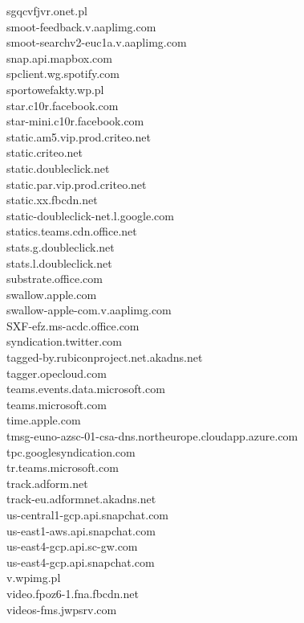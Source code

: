 \documentclass[12pt,a4paper]{article}
\begin{document}
\begin{scriptsize}
\begin{multicols}{3}
\begin{center}
                    sgqcvfjvr.onet.pl\\smoot-feedback.v.aaplimg.com\\smoot-searchv2-euc1a.v.aaplimg.com\\snap.api.mapbox.com\\spclient.wg.spotify.com\\
                    sportowefakty.wp.pl\\star.c10r.facebook.com\\star-mini.c10r.facebook.com\\static.am5.vip.prod.criteo.net\\static.criteo.net\\
                    static.doubleclick.net\\static.par.vip.prod.criteo.net\\static.xx.fbcdn.net\\static-doubleclick-net.l.google.com\\
                    statics.teams.cdn.office.net\\stats.g.doubleclick.net\\stats.l.doubleclick.net\\substrate.office.com\\swallow.apple.com\\
                    swallow-apple-com.v.aaplimg.com\\SXF-efz.ms-acdc.office.com\\syndication.twitter.com\\tagged-by.rubiconproject.net.akadns.net\\
                    tagger.opecloud.com\\teams.events.data.microsoft.com\\teams.microsoft.com\\time.apple.com\\
                    tmsg-euno-azsc-01-csa-dns.northeurope.cloudapp.azure.com\\tpc.googlesyndication.com\\tr.teams.microsoft.com\\track.adform.net\\
                    track-eu.adformnet.akadns.net\\us-central1-gcp.api.snapchat.com\\us-east1-aws.api.snapchat.com\\us-east4-gcp.api.sc-gw.com\\
                    us-east4-gcp.api.snapchat.com\\v.wpimg.pl\\video.fpoz6-1.fna.fbcdn.net\\videos-fms.jwpsrv.com\\

\end{center}
\end{multicols}
\end{scriptsize}
\end{document}

